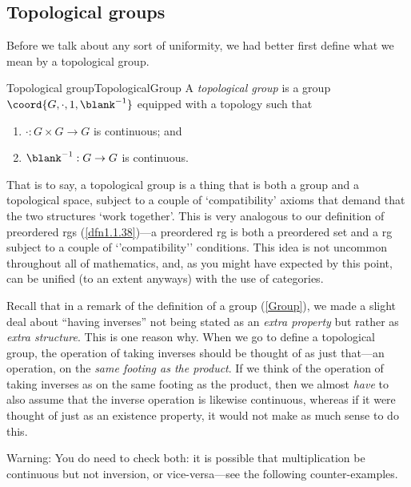 \subsection{Topological groups}

Before we talk about any sort of uniformity, we had better first define what we mean by a topological group.
\begin{dfn}{Topological group}{TopologicalGroup}
A \emph{topological group} is a group $\coord{G,\cdot ,1,\blank ^{-1}}$ equipped with a topology such that
\begin{enumerate}
\item $\cdot :G\times G\rightarrow G$ is continuous; and
\item $\blank ^{-1}:G\rightarrow G$ is continuous.
\end{enumerate}
\begin{rmk}
That is to say, a topological group is a thing that is both a group and a topological space, subject to a couple of `compatibility' axioms that demand that the two structures `work together'.  This is very analogous to our definition of preordered rgs (\cref{dfn1.1.38})---a preordered rg is both a preordered set and a rg subject to a couple of `'compatibility'' conditions.  This idea is not uncommon throughout all of mathematics, and, as you might have expected by this point, can be unified (to an extent anyways) with the use of categories.
\end{rmk}
\begin{rmk}
Recall that in a remark of the definition of a group (\cref{Group}), we made a slight deal about ``having inverses'' not being stated as an \emph{extra property} but rather as \emph{extra structure}.  This is one reason why.  When we go to define a topological group, the operation of taking inverses should be thought of as just that---an operation, on the \emph{same footing as the product}.  If we think of the operation of taking inverses as on the same footing as the product, then we almost \emph{have} to also assume that the inverse operation is likewise continuous, whereas if it were thought of just as an existence property, it would not make as much sense to do this.
\end{rmk}
\begin{wrn}
Warning:  You do need to check both:  it is possible that multiplication be continuous but not inversion, or vice-versa---see the following counter-examples.
\end{wrn}
\end{dfn}
